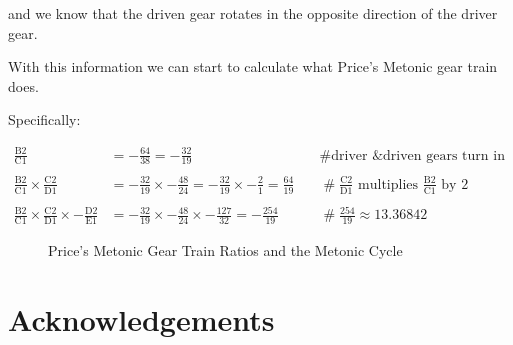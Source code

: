 \documentclass[11pt, oneside]{article}   	%
\theoremstyle{definition}
\begin{document}
\bigskip
\noindent
and we know that the driven gear rotates in the opposite direction of the driver gear. 


\bigskip
\noindent
With this information we can start to calculate what Price's Metonic gear train does. 

\bigskip
\noindent
Specifically:

\begin{equation*}
\begin{array}{lllll}
\frac{\text{B2}}{\text{C1}} &= - \frac{64}{38} = - \frac{32}{19} & \quad \mathrel{\#} \text{driver \& driven gears turn in opposite directions} \\ \\
\frac{\text{B2}}{\text{C1}} \times \frac{\text{C2}}{\text{D1}} &= - \frac{32}{19} \times - \frac{48}{24} = - \frac{32}{19} \times - \frac{2}{1} = \frac{64}{19} 
& \quad \mathrel{\#} \frac{\text{C2}}{\text{D1}} \text{ multiplies $\frac{\text{B2}}{\text{C1}}$ by $2$}                       \\ \\
\frac{\text{B2}}{\text{C1}} \times \frac{\text{C2}}{\text{D1}} \times - \frac{\text{D2}}{\text{E1}} &= - \frac{32}{19} \times - \frac{48}{24} \times - \frac{127}{32} 
=  -\frac{254}{19} & \quad \mathrel{\#} \frac{254}{19} \approx 13.36842
\end{array}
\end{equation*}

\bigskip
\bigskip
\begin{figure}[H]
\caption{Price's Metonic Gear Train Ratios and the Metonic Cycle}
\label{fig:metonic_gear_ratios}
\end{figure}

\bigskip
\section{Acknowledgements}

\newpage


\end{document}
